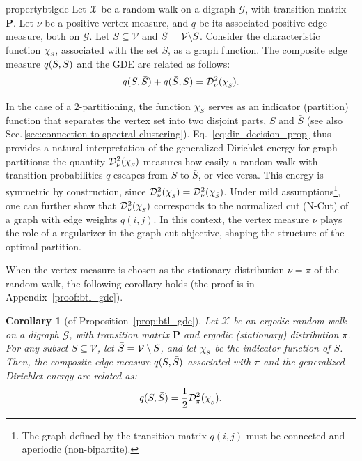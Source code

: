 \documentclass[10pt]{article} %
\def\eqref#1{equation~\ref{#1}}
\def\rmP{{\mathbf{P}}}
\def\gV{{\mathcal{V}}}
\newcommand{\q}{q}
\newtheorem{corollary}{Corollary}[section]
\newcommand{\GDE}{GDE\xspace}
\newcommand{\D}[2]{\mathcal{D}^2_{#1}(#2)}
\newcommand{\chivec}[1] {{\chi_{\raisebox{-0.15em}{\scalebox{0.6}{$#1$}}}}}
\renewcommand{\eqref}[1]{\ref{#1}}
\begin{document}
\begin{restatable}[]{property}{btlgde}\label{prop:btl_gde}
  Let $\mathcal{X}$ be a random walk on a digraph $\mathcal{G}$, with transition matrix $\rmP$. Let $\nu$ be a positive vertex measure, and $\q$ be its associated positive edge measure, both on $\mathcal{G}$. Let $S \subseteq \gV $ and $\Bar{S} = \gV  \backslash S$. Consider the characteristic function $\chivec{S}$, associated with the set $S$, as a graph function. The composite edge measure $\q(S,\Bar{S})$ and the \GDE are related as follows:
  \begin{equation}\label{eq:dir_decision_prop}
    \q(S,\Bar{S})+\q(\Bar{S},S)=\D{\nu}{\chivec{S}}.
  \end{equation}
\end{restatable}
%
In the case of a $2$-partitioning, the function $\chivec{S}$ serves as an indicator (partition) function that separates the vertex set into two disjoint parts, $S$ and $\bar{S}$ (see also Sec.\,\ref{sec:connection-to-spectral-clustering}). Eq.~\eqref{eq:dir_decision_prop} thus provides a natural interpretation of the generalized Dirichlet energy for graph partitions: the quantity $\D{\nu}{\chivec{S}}$ measures how easily a random walk with transition probabilities $\q$ escapes from $S$ to $\bar{S}$, or vice versa. This energy is symmetric by construction, since $\D{\nu}{\chivec{S}} = \D{\nu}{\chivec{\bar{S}}}$. Under mild assumptions\footnote{The graph defined by the transition matrix $\q(i,j)$ must be connected and aperiodic (non-bipartite).}, one can further show that $\D{\nu}{\chivec{S}}$ corresponds to the normalized cut (N-Cut) of a graph with edge weights $\q(i,j)$. In this context, the vertex measure $\nu$ plays the role of a regularizer in the graph cut objective, shaping the structure of the optimal partition.

When the vertex measure is chosen as the stationary distribution $\nu = \pi$ of the random walk, the following corollary holds (the proof is in Appendix~\ref{proof:btl_gde}).

%
\begin{corollary}[of Proposition~\ref{prop:btl_gde}]
  Let $\mathcal{X}$ be an ergodic random walk on a digraph $\mathcal{G}$, with transition matrix $\rmP$ and ergodic (stationary) distribution $\pi$. For any subset $S \subseteq \gV$, let $\Bar{S} = \gV \setminus S$, and let $\chivec{S}$ be the indicator function of $S$. Then, the composite edge measure $\q(S,\Bar{S})$ associated with $\pi$ and the generalized Dirichlet energy are related as:
  \begin{equation} \label{corr:prop:btl_gde}
    \q(S,\Bar{S}) = \frac{1}{2} \D{\pi}{\chivec{S}}.
  \end{equation}
\end{corollary}
\end{document}
